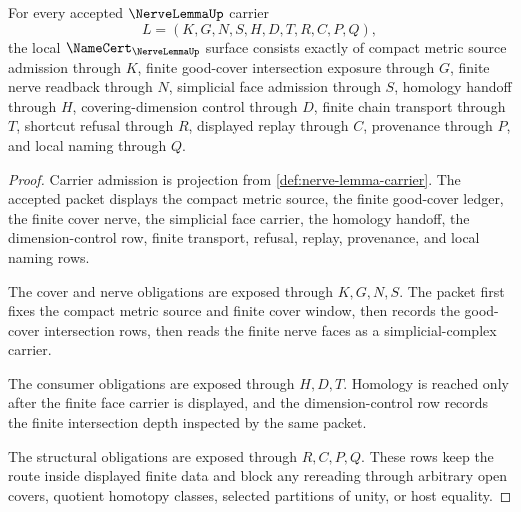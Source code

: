 \begin{theorem}
\label{thm:nerve-lemma-namecert-obligations}
For every accepted $\NerveLemmaUp$ carrier
$$
L=(K,G,N,S,H,D,T,R,C,P,Q),
$$
the local $\NameCert_{\NerveLemmaUp}$ surface consists exactly of compact metric source admission through $K$, finite good-cover intersection exposure through $G$, finite nerve readback through $N$, simplicial face admission through $S$, homology handoff through $H$, covering-dimension control through $D$, finite chain transport through $T$, shortcut refusal through $R$, displayed replay through $C$, provenance through $P$, and local naming through $Q$.
\end{theorem}
\begin{proof}
Carrier admission is projection from \autoref{def:nerve-lemma-carrier}. The accepted packet displays the compact metric source, the finite good-cover ledger, the finite cover nerve, the simplicial face carrier, the homology handoff, the dimension-control row, finite transport, refusal, replay, provenance, and local naming rows.

The cover and nerve obligations are exposed through $K,G,N,S$. The packet first fixes the compact metric source and finite cover window, then records the good-cover intersection rows, then reads the finite nerve faces as a simplicial-complex carrier.

The consumer obligations are exposed through $H,D,T$. Homology is reached only after the finite face carrier is displayed, and the dimension-control row records the finite intersection depth inspected by the same packet.

The structural obligations are exposed through $R,C,P,Q$. These rows keep the route inside displayed finite data and block any rereading through arbitrary open covers, quotient homotopy classes, selected partitions of unity, or host equality.
\end{proof}

